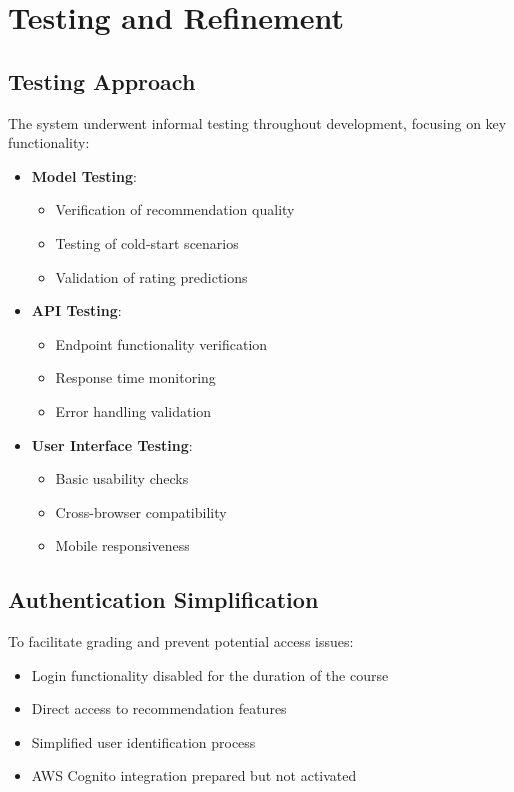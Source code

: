 \documentclass[12pt]{article}
\begin{document}
\section{Testing and Refinement}

\subsection{Testing Approach}
The system underwent informal testing throughout development, focusing on key functionality:

\begin{itemize}
    \item \textbf{Model Testing}:
    \begin{itemize}
        \item Verification of recommendation quality
        \item Testing of cold-start scenarios
        \item Validation of rating predictions
    \end{itemize}
    
    \item \textbf{API Testing}:
    \begin{itemize}
        \item Endpoint functionality verification
        \item Response time monitoring
        \item Error handling validation
    \end{itemize}
    
    \item \textbf{User Interface Testing}:
    \begin{itemize}
        \item Basic usability checks
        \item Cross-browser compatibility
        \item Mobile responsiveness
    \end{itemize}
\end{itemize}

\subsection{Authentication Simplification}
To facilitate grading and prevent potential access issues:

\begin{itemize}
    \item Login functionality disabled for the duration of the course
    \item Direct access to recommendation features
    \item Simplified user identification process
    \item AWS Cognito integration prepared but not activated
\end{itemize}
\end{document}
